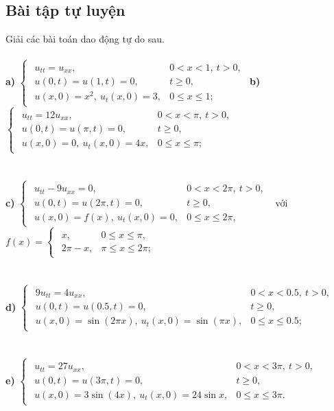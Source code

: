\documentclass[10pt, a4paper]{article}
\begin{document}
	\subsection{Bài tập tự luyện}
	Giải các bài toán dao động tự do sau.\\\\
	\textbf{a) } $\begin{cases}
		\begin{array}{ll}
			u_{tt}=u_{xx}, & 0<x<1,~t>0,\\
			u(0,t)=u(1,t)=0, & t\ge0,\\
			u(x,0)=x^2,~u_t(x,0)=3, & 0\le x\le1;
		\end{array}
	\end{cases}$\hspace{0.1cm}\textbf{b) } $\begin{cases}
		\begin{array}{ll}
			u_{tt}=12u_{xx}, & 0<x<\pi,~t>0,\\
			u(0,t)=u(\pi,t)=0, & t\ge0,\\
			u(x,0)=0,~u_t(x,0)=4x, & 0\le x\le\pi;
		\end{array}
	\end{cases}$\\\\\\
	\textbf{c) } $\begin{cases}
		\begin{array}{ll}
			u_{tt}-9u_{xx}=0, & 0<x<2\pi,~t>0,\\
			u(0,t)=u(2\pi,t)=0, & t\ge0,\\
			u(x,0)=f(x),~u_t(x,0)=0, & 0\le x\le2\pi,
		\end{array}
	\end{cases}$ với $f(x)=\begin{cases}
		\begin{array}{ll}
			x, & 0\le x\le\pi,\\
			2\pi-x, & \pi\le x\le2\pi;
		\end{array}
	\end{cases}$\\\\\\
	\textbf{d) } $\begin{cases}
		\begin{array}{ll}
			9u_{tt}=4u_{xx}, & 0<x<0.5,~t>0,\\
			u(0,t)=u(0.5,t)=0, & t\ge0,\\
			u(x,0)=\sin(2\pi x),~u_t(x,0)=\sin(\pi x), & 0\le x\le0.5;
		\end{array}
	\end{cases}$\\\\\\
	\textbf{e) } $\begin{cases}
		\begin{array}{ll}
			u_{tt}=27u_{xx}, & 0<x<3\pi,~t>0,\\
			u(0,t)=u(3\pi,t)=0, & t\ge0,\\
			u(x,0)=3\sin(4x),~u_t(x,0)=24\sin x, & 0\le x\le3\pi.
		\end{array}
	\end{cases}$
	\newpage
\end{document}
